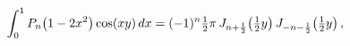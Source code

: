 \[\int_{0}^{1}\mathop{P_{n}\/}\nolimits\!\left(1-2x^{2}\right)\mathop{\cos\/}%
\nolimits\!\left(xy\right)dx=(-1)^{n}\tfrac{1}{2}\pi\mathop{J_{n+\frac{1}{2}}%
\/}\nolimits\!\left(\tfrac{1}{2}y\right)\mathop{J_{-n-\frac{1}{2}}\/}\nolimits%
\!\left(\tfrac{1}{2}y\right),\]